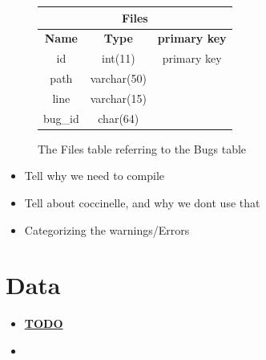 \documentclass[a4paper,11pt]{report}
\newcommand{\figa}{
    \begin{figure}[!htpb]
    \centering
}
\newcommand{\figb}[2]{
    \caption{#1}
    \label{#2}
    \end{figure}
}
\begin{document}
\figa
    \begin{tabular}{c|c|c}
        \hline
        \hline
        \multicolumn{3}{c}{\textbf{Files}} \\
        \hline
        \textbf{Name} & \textbf{Type} &\textbf{primary key} \\
        \hline
        id & int(11) & primary key \\
        path & varchar(50) \\
        line & varchar(15) \\
        bug\_id & char(64) \\
        \hline
        \hline
    \end{tabular}
\figb{The Files table referring to the Bugs table}{fig:filestable}

\begin{itemize}
    \item Tell why we need to compile
    \item Tell about coccinelle, and why we dont use that
    \item Categorizing the warnings/Errors
\end{itemize}




\newpage
\chapter{Data}




\begin{itemize}
    \item \underline{\textbf{TODO}}
        \item 
\end{itemize}

\newpage
\end{document}
